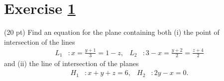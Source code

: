 %
%
%
%

\section{Exercise \ref{sec: Math212 2016 Fall HalfExam01Q01}}
\label{sec: Math212 2016 Fall HalfExam01Q01}


(20 pt) Find an equation for the plane containing both (i) the point of intersection of the lines
\begin{align*}
L_{1}&:
x
=
\frac{y + 1}{3}
=
1 - z,
&
L_{2}&:
3 - x
=
\frac{y + 2}{2}
=
\frac{z + 4}{2}
\end{align*}
and (ii) the line of intersection of the planes
\begin{align*}
H_{1}&:
x + y + z
=
6,
&
H_{2}&:
2 y - x
=
0.
\end{align*}



